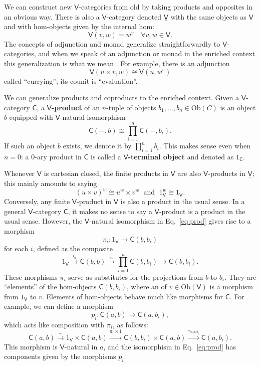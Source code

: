 \documentclass{amsart}
\newcommand{\define}[1]{{\bf \boldmath{#1}}}
\theoremstyle{definition}
\newcommand{\V}{\mathsf{V}}
\newcommand{\C}{\mathsf{C}}
\newcommand{\Obj}{\mathrm{Ob}}
\newcommand{\maps}{\colon}
\begin{document}
We can construct new $\V$-categories from old by taking products and opposites in an obvious way.   There is also a $\V$-category denoted $\underline{\V}$ with the same objects as 
$\V$ and with hom-objects given by the internal hom:
\[   \underline{\V}(v,w) = w^v   \quad \forall v,w \in \V  .\]
The concepts of adjunction and monad generalize straightforwardly to $\V$-categories,
and when we speak of an adjunction or monad in the enriched context this generalization
is what we mean \cite{kelly}.   For example, there is an adjunction
\[    \underline{\V}(u \times v, w) \cong \underline{\V}(u, w^v ) \]
called ``currying''; its counit is ``evaluation''.  

We can generalize products and coproducts to the enriched context.
Given a $\V$-category $\C$,  a \textbf{$\V$-product} of an $n$-tuple of 
objects $b_1, \dots , b_n \in \Obj(C)$ is an object $b$ equipped with $\V$-natural
isomorphism
\begin{equation}
\label{eq:prod}          \C(-,b) \cong \prod_{i=1}^n \C(-,b_i). 
\end{equation}
If such an object $b$ exists, we denote it by $\prod_{i=1}^n b_i$.   This makes sense
even when $n = 0$: a 0-ary product in $\C$ is called a \textbf{$\V$-terminal object} and denoted
as $1_\C$.  

Whenever $\V$ is cartesian closed, the finite products in $\V$ are also $\V$-products in 
$\underline{\V}$; this mainly amounts to saying
\[           (u \times v)^w \cong u^w \times v^w \; \textrm{ and } \; 1_\V^w \cong 1_\V .\]
Conversely, any finite $\V$-product in $\V$ is also a product in the usual sense. 
In a general $\V$-category $\C$, it makes no sense to say a $\V$-product is a product
in the usual sense.  However, the $\V$-natural isomorphism in Eq.\ \eqref{eq:prod} gives rise
to a morphism
\[    \pi_i \maps 1_\V \to \C(b,b_i)  \]
for each $i$, defined as the composite
\[    1_\V \stackrel{i_a}{\longrightarrow} \C(b,b) \stackrel{\sim}{\longrightarrow} \prod_{i=1}^n \C(b,b_i) \longrightarrow \C(b,b_i) .\]
These morphisms $\pi_i$ serve as substitutes for the projections from $b$ to $b_i$.  They are  ``elements'' of the hom-objects $\C(b,b_i)$, where an \define{element} of $v \in \Obj(\V)$ is a 
morphism from $1_\V$ to $v$.    Elements of hom-objects behave much like morphisms for 
$\C$.  For example, we can define a morphism
\[      p_i \maps \C(a,b) \to \C(a,b_i), \]
which acts like composition with $\pi_i$, as follows: 
\[     \C(a,b) \stackrel{\sim}{\longrightarrow} 1_\V \times \C(a,b)  
 \stackrel{\pi_i \times 1}{\longrightarrow} \C(b,b_i) \times \C(a,b) \stackrel{\circ_{a,b,b_i}}{\longrightarrow} \C(a,b_i). \]
This morphism is $\V$-natural in $a$, and the isomorphism in Eq.\ \eqref{eq:prod} has components given by the morphisms $p_i$.
\end{document}
